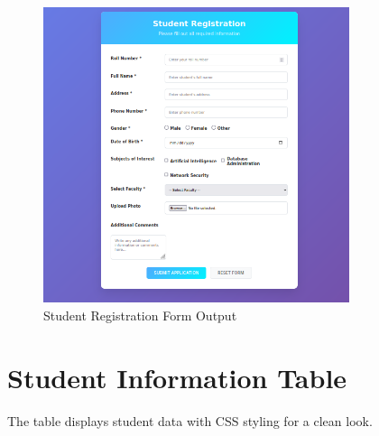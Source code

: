 \documentclass[a4paper,12pt]{article}
\begin{document}
\begin{figure}[h]
    \centering
    \includegraphics[width=0.8\textwidth]{10_screenshot.png}
    \caption{Student Registration Form Output}
\end{figure}

\section{Student Information Table}
The table displays student data with CSS styling for a clean look.
\end{document}
